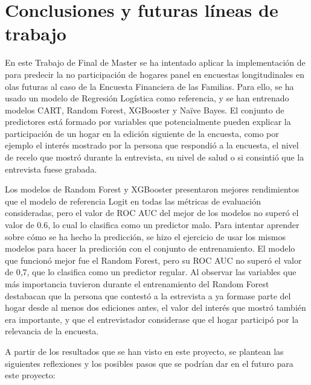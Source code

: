 \chapter{Conclusiones y futuras líneas de trabajo}
\label{chapter:conclusiones}

En este Trabajo de Final de Master se ha intentado aplicar la implementación de \cite{beste2023case} para predecir la no participación de hogares panel en encuestas longitudinales en olas futuras al caso de la Encuesta Financiera de las Familias. Para ello, se ha usado un modelo de Regresión Logística como referencia, y se han entrenado modelos CART, Random Forest, XGBooster y Naïve Bayes. El conjunto de predictores está formado por variables que potencialmente pueden explicar la participación de un hogar en la edición siguiente de la encuesta, como por ejemplo el interés mostrado por la persona que respondió a la encuesta, el nivel de recelo que mostró durante la entrevista, su nivel de salud o si consintió que la entrevista fuese grabada.

Los modelos de Random Forest y XGBooster presentaron mejores rendimientos que el modelo de referencia Logit en todas las métricas de evaluación consideradas, pero el valor de ROC AUC del mejor de los modelos no superó el valor de 0.6, lo cual lo clasifica como un predictor malo. Para intentar aprender sobre cómo se ha hecho la predicción, se hizo el ejercicio de usar los mismos modelos para hacer la predicción con el conjunto de entrenamiento. El modelo que funcionó mejor fue el Random Forest, pero su ROC AUC no superó el valor de 0,7, que lo clasifica como un predictor regular. Al observar las variables que más importancia tuvieron durante el entrenamiento del Random Forest destabacan que la persona que contestó a la estrevista a ya formase parte del hogar desde al menos dos ediciones antes, el valor del interés que mostró también era importante, y que el entrevistador considerase que el hogar participó por la relevancia de la encuesta.

A partir de los resultados que se han visto en este proyecto, se plantean las siguientes reflexiones y los posibles pasos que se podrían dar en el futuro para este proyecto:


